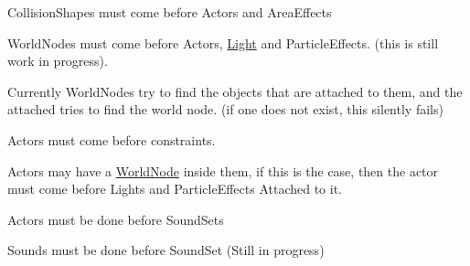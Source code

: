 \begin{DoxyItemize}
\item CollisionShapes must come before Actors and AreaEffects
\item WorldNodes must come before Actors, \hyperlink{classMezzanine_1_1Light}{Light} and ParticleEffects. (this is still work in progress).
\begin{DoxyItemize}
\item Currently WorldNodes try to find the objects that are attached to them, and the attached tries to find the world node. (if one does not exist, this silently fails)
\end{DoxyItemize}
\item Actors must come before constraints.
\item Actors may have a \hyperlink{classMezzanine_1_1WorldNode}{WorldNode} inside them, if this is the case, then the actor must come before Lights and ParticleEffects Attached to it.
\item Actors must be done before SoundSets
\item Sounds must be done before SoundSet (Still in progress)
\end{DoxyItemize}

